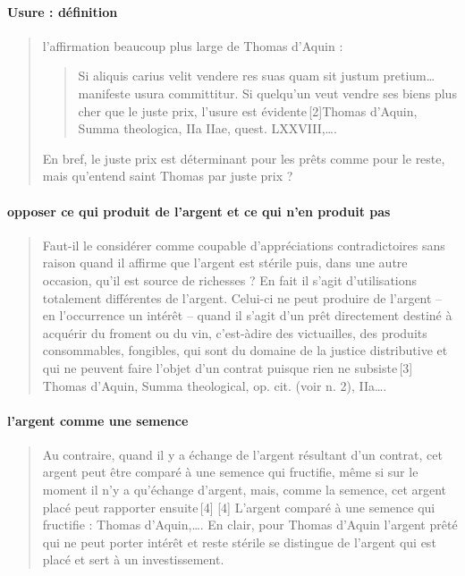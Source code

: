  \paragraph{Usure : définition}
 \begin{quote}
     l’affirmation beaucoup plus large de Thomas d’Aquin : 
     \begin{quote}
         Si aliquis carius velit vendere res suas quam sit justum pretium… manifeste usura committitur. Si quelqu’un veut vendre ses biens plus cher que le juste prix, l’usure est évidente [2]Thomas d’Aquin, Summa theologica, IIa IIae, quest. LXXVIII,….
     \end{quote} 

 En bref, le juste prix est déterminant pour les prêts comme pour le reste, mais qu’entend saint Thomas par juste prix ?
 \end{quote}
 
 
 \paragraph{opposer ce qui produit de l'argent et ce qui n'en produit pas}
 \begin{quote}
      Faut-il le considérer comme coupable d’appréciations contradictoires sans raison quand il affirme que l’argent est stérile puis, dans une autre occasion, qu’il est source de richesses ? En fait il s’agit d’utilisations totalement différentes de l’argent. Celui-ci ne peut produire de l’argent – en l’occurrence un intérêt – quand il s’agit d’un prêt directement destiné à acquérir du froment ou du vin, c’est-àdire des victuailles, des produits consommables, fongibles, qui sont du domaine de la justice distributive et qui ne peuvent faire l’objet d’un contrat puisque rien ne subsiste [3]
Thomas d’Aquin, Summa theological, op. cit. (voir n. 2), IIa…. 
 \end{quote}
 
 
 \paragraph{l'argent comme une semence}
 \begin{quote}
      Au contraire, quand il y a échange de l’argent résultant d’un contrat, cet argent peut être comparé à une semence qui fructifie, même si sur le moment il n’y a qu’échange d’argent, mais, comme la semence, cet argent placé peut rapporter ensuite [4]
[4]
L’argent comparé à une semence qui fructifie : Thomas d’Aquin,…. En clair, pour Thomas d’Aquin l’argent prêté qui ne peut porter intérêt et reste stérile se distingue de l’argent qui est placé et sert à un investissement.
 \end{quote}
 
